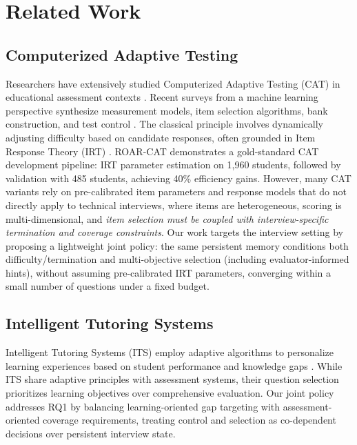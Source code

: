 ﻿\documentclass[final,3p,times,authoryear]{elsarticle}
\begin{document}
\section{Related Work}
\label{sec:related}

\subsection{Computerized Adaptive Testing}

\noindent Researchers have extensively studied Computerized Adaptive Testing (CAT) in educational assessment contexts \cite{van2006computerized}. Recent surveys from a machine learning perspective synthesize measurement models, item selection algorithms, bank construction, and test control \cite{zhuang2024catsurvey}. The classical principle involves dynamically adjusting difficulty based on candidate responses, often grounded in Item Response Theory (IRT) \cite{hambleton1991fundamentals}. ROAR-CAT \cite{roarcat2025} demonstrates a gold-standard CAT development pipeline: IRT parameter estimation on 1,960 students, followed by validation with 485 students, achieving 40\% efficiency gains. However, many CAT variants rely on pre-calibrated item parameters and response models that do not directly apply to technical interviews, where items are heterogeneous, scoring is multi-dimensional, and \emph{item selection must be coupled with interview-specific termination and coverage constraints}. Our work targets the interview setting by proposing a lightweight joint policy: the same persistent memory conditions both difficulty/termination and multi-objective selection (including evaluator-informed hints), without assuming pre-calibrated IRT parameters, converging within a small number of questions under a fixed budget.

\subsection{Intelligent Tutoring Systems}

\noindent Intelligent Tutoring Systems (ITS) employ adaptive algorithms to personalize learning experiences based on student performance and knowledge gaps \cite{vanlehn2011relative}. While ITS share adaptive principles with assessment systems, their question selection prioritizes learning objectives over comprehensive evaluation. Our joint policy addresses RQ1 by balancing learning-oriented gap targeting with assessment-oriented coverage requirements, treating control and selection as co-dependent decisions over persistent interview state.
\end{document}
